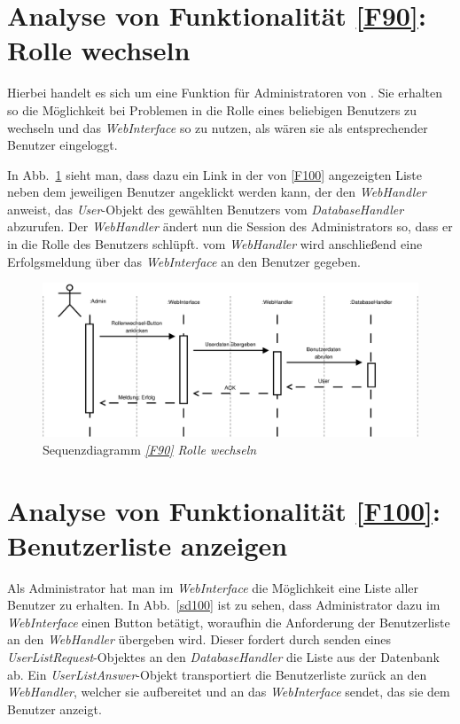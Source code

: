 \FloatBarrier

\section{Analyse von Funktionalität \ref{F90}: Rolle wechseln}

Hierbei handelt es sich um eine Funktion für Administratoren von \NewsGenie. Sie
erhalten so die Möglichkeit bei Problemen in die Rolle eines beliebigen
Benutzers zu wechseln und das \textit{WebInterface} so zu nutzen, als wären sie
als entsprechender Benutzer eingeloggt.

In Abb.~\ref{sd90} sieht man, dass dazu ein Link in der von \ref{F100}
angezeigten Liste neben dem jeweiligen Benutzer angeklickt werden kann, der den
\textit{WebHandler} anweist, das \textit{User}-Objekt des gewählten Benutzers
vom \textit{DatabaseHandler} abzurufen. Der \textit{WebHandler} ändert nun die
Session des Administrators so, dass er in die Rolle des Benutzers schlüpft. vom
\textit{WebHandler} wird anschließend eine Erfolgsmeldung über das
\textit{WebInterface} an den Benutzer gegeben.

\begin{figure}[h]
\centering
\includegraphics[width=1\textwidth]{Systementwurf/02_produktfunktionsanalyse/f900}
\caption{Sequenzdiagramm \textit{\ref{F90} Rolle wechseln}
\label{sd90}}
\end{figure}


\section{Analyse von Funktionalität \ref{F100}: Benutzerliste anzeigen}

Als Administrator hat man im \textit{WebInterface} die Möglichkeit eine Liste
aller Benutzer zu erhalten. In Abb.~\ref{sd100} ist zu sehen, dass Administrator
dazu im \textit{WebInterface} einen Button betätigt, woraufhin die Anforderung
der Benutzerliste an den \textit{WebHandler} übergeben wird. Dieser fordert
durch senden eines \textit{UserListRequest}-Objektes an den
\textit{DatabaseHandler} die Liste aus der Datenbank ab. Ein
\textit{UserListAnswer}-Objekt transportiert die Benutzerliste zurück an den
\textit{WebHandler}, welcher sie aufbereitet und an das \textit{WebInterface}
sendet, das sie dem Benutzer anzeigt.

